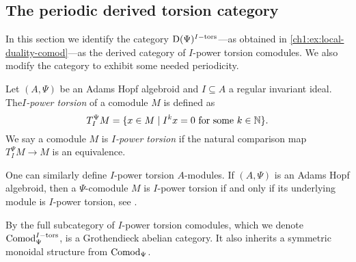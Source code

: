 
















\subsection{The periodic derived torsion category}
\label{ch1:ssec:the-algebraic-model}

In this section we identify the category $\mathrm{D}(\Psi)^{I-\mathrm{tors}}$---as obtained in \cref{ch1:ex:local-duality-comod}---as the derived category of $I$-power torsion comodules. We also modify the category to exhibit some needed periodicity. 

\begin{definition}
    \label{ch1:def:I-power-torsion-comodule}
    Let $(A,\Psi)$ be an Adams Hopf algebroid and $I\subseteq A$ a regular invariant ideal. The\emph{$I$-power torsion} of a comodule $M$ is defined as 
    \[T_I^\Psi M = \{x\in M \mid I^k x = 0 \text{ for some } k\in \mathbb{N}\}.\]
    We say a comodule $M$ is \emph{$I$-power torsion} if the natural comparison map $T_I^\Psi M\longrightarrow M$ is an equivalence. 
\end{definition}

\begin{remark}
    \label{ch1:rm:torsion-iff-underlying-is-torsion}
    One can similarly define $I$-power torsion $A$-modules. If $(A,\Psi)$ is an Adams Hopf algebroid, then a $\Psi$-comodule $M$ is $I$-power torsion if and only if its underlying module is $I$-power torsion, see \cite[5.7]{barthel-heard-valenzuela_2018}. 
\end{remark}

\begin{remark}
    \label{ch1:rm:torsion-comodules-grothendieck-monoidal}
    By \cite[5.10]{barthel-heard-valenzuela_2018} the full subcategory of $I$-power torsion comodules, which we denote $\mathrm{Comod}_\Psi^{I-\mathrm{tors}}$, is a Grothendieck abelian category. It also inherits a symmetric monoidal structure from $\mathrm{Comod}_\Psi$. 
\end{remark}

